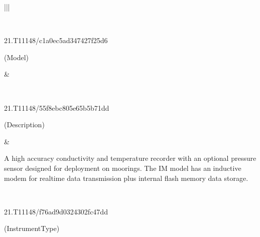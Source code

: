 \documentclass[a4paper,10pt,english]{sphinxmanual}
\begin{document}
\begin{savenotes}
\begin{longtable}[t]{|*{2}{|}}
\begin{sphinxVerbatimintable}[commandchars=\\\{\}]
\PYG{p}{]}
\end{sphinxVerbatimintable}
\\
\hline
\begin{DUlineblock}{0em}
\item[] 21.T11148/c1a0ec5ad347427f25d6
\item[] (Model)
\end{DUlineblock}
&
\begin{sphinxVerbatimintable}[commandchars=\\\{\}]
\PYG{p}{[}
\PYG{p}{]}
\end{sphinxVerbatimintable}
\\
\hline
\begin{DUlineblock}{0em}
\item[] 21.T11148/55f8ebc805e65b5b71dd
\item[] (Description)
\end{DUlineblock}
&
\begin{sphinxVerbatimintable}[commandchars=\\\{\}]
A high accuracy conductivity and temperature recorder with an optional
pressure sensor designed for deployment on moorings. The IM model has an
inductive modem for real\PYGZhy{}time data transmission plus internal flash memory
data storage.
\end{sphinxVerbatimintable}
\\
\hline
\begin{DUlineblock}{0em}
\item[] 21.T11148/f76ad9d0324302fc47dd
\item[] (InstrumentType)

\end{DUlineblock}
\end{longtable}
\end{savenotes}
\end{document}
